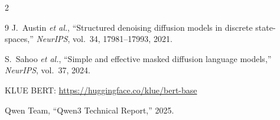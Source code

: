 \documentclass[10pt,a4paper]{article}
\begin{document}
\begin{multicols}{2}
\begin{thebibliography}{9}
J.~Austin \textit{et al.},
``Structured denoising diffusion models in discrete state-spaces,''
\textit{NeurIPS}, vol.~34, 17981--17993, 2021.

S.~Sahoo \textit{et al.},
``Simple and effective masked diffusion language models,''
\textit{NeurIPS}, vol.~37, 2024.

KLUE BERT: \url{https://huggingface.co/klue/bert-base}

Qwen Team, ``Qwen3 Technical Report,'' 2025.

\end{thebibliography}

\end{multicols}
\end{document}
